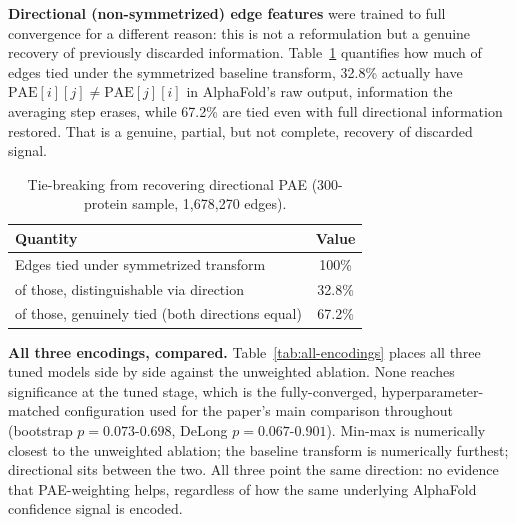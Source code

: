 \documentclass[10pt,conference,a4paper]{IEEEtran}
\begin{document}
\textbf{Directional (non-symmetrized) edge features} were trained to full convergence for a different reason: this is not a reformulation but a genuine recovery of previously discarded information. Table~\ref{tab:tie-breaking} quantifies how much of edges tied under the symmetrized baseline transform, 32.8\% actually have $\mathrm{PAE}[i][j]\neq\mathrm{PAE}[j][i]$ in AlphaFold's raw output, information the averaging step erases, while 67.2\% are tied even with full directional information restored. That is a genuine, partial, but not complete, recovery of discarded signal.

\begin{table}[!ht]
\centering
\caption{Tie-breaking from recovering directional PAE (300-protein sample, 1{,}678{,}270 edges).}
\label{tab:tie-breaking}
\small
\begin{tabular}{@{}lc@{}}
\toprule
Quantity & Value \\
\midrule
Edges tied under symmetrized transform & 100\% \\
\quad of those, distinguishable via direction & 32.8\% \\
\quad of those, genuinely tied (both directions equal) & 67.2\% \\
\bottomrule
\end{tabular}
\end{table}

\textbf{All three encodings, compared.} Table~\ref{tab:all-encodings} places all three tuned models side by side against the unweighted ablation. None reaches significance at the tuned stage, which is the fully-converged, hyperparameter-matched configuration used for the paper's main comparison throughout (bootstrap $p=0.073$-$0.698$, DeLong $p=0.067$-$0.901$). Min-max is numerically closest to the unweighted ablation; the baseline transform is numerically furthest; directional sits between the two. All three point the same direction: no evidence that PAE-weighting helps, regardless of how the same underlying AlphaFold confidence signal is encoded.

\begin{table}[!ht]
\centering
\caption{All three PAE encodings vs.\ unweighted ablation (tuned models).}
\label{tab:all-encodings}
\small
{}
\end{table}
\end{document}

